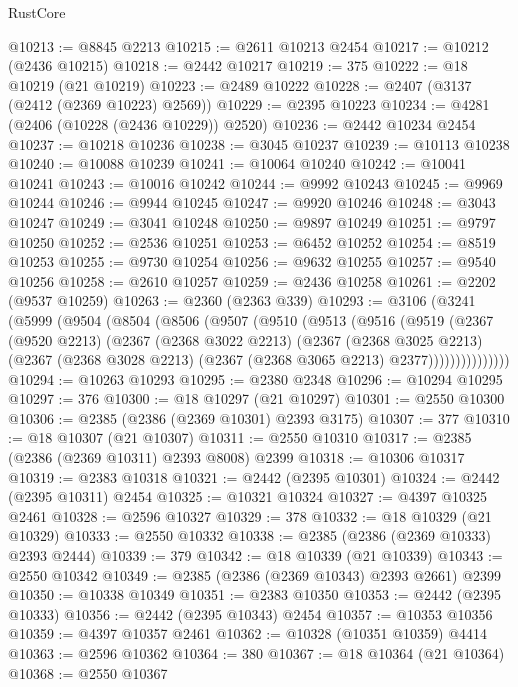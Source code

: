 \begin{lexlean}{RustCore}
\begin{coremodule}
@10213 := @8845 @2213
@10215 := @2611 @10213 @2454
@10217 := @10212 (@2436 @10215)
@10218 := @2442 @10217
@10219 := 375
@10222 := @18 @10219 (@21 @10219)
@10223 := @2489 @10222
@10228 := @2407 (@3137 (@2412 (@2369 @10223) @2569))
@10229 := @2395 @10223
@10234 := @4281 (@2406 (@10228 (@2436 @10229)) @2520)
@10236 := @2442 @10234 @2454
@10237 := @10218 @10236
@10238 := @3045 @10237
@10239 := @10113 @10238
@10240 := @10088 @10239
@10241 := @10064 @10240
@10242 := @10041 @10241
@10243 := @10016 @10242
@10244 := @9992 @10243
@10245 := @9969 @10244
@10246 := @9944 @10245
@10247 := @9920 @10246
@10248 := @3043 @10247
@10249 := @3041 @10248
@10250 := @9897 @10249
@10251 := @9797 @10250
@10252 := @2536 @10251
@10253 := @6452 @10252
@10254 := @8519 @10253
@10255 := @9730 @10254
@10256 := @9632 @10255
@10257 := @9540 @10256
@10258 := @2610 @10257
@10259 := @2436 @10258
@10261 := @2202 (@9537 @10259)
@10263 := @2360 (@2363 @339)
@10293 := @3106
    (@3241
      (@5999
        (@9504
          (@8504
            (@8506
              (@9507
                (@9510
                  (@9513
                    (@9516
                      (@9519
                        (@2367
                          (@9520 @2213)
                          (@2367
                            (@2368 @3022 @2213)
                            (@2367
                              (@2368 @3025 @2213)
                              (@2367
                                (@2368 @3028 @2213)
                                (@2367 (@2368 @3065 @2213) @2377)))))))))))))))
@10294 := @10263 @10293
@10295 := @2380 @2348
@10296 := @10294 @10295
@10297 := 376
@10300 := @18 @10297 (@21 @10297)
@10301 := @2550 @10300
@10306 := @2385 (@2386 (@2369 @10301) @2393 @3175)
@10307 := 377
@10310 := @18 @10307 (@21 @10307)
@10311 := @2550 @10310
@10317 := @2385 (@2386 (@2369 @10311) @2393 @8008) @2399
@10318 := @10306 @10317
@10319 := @2383 @10318
@10321 := @2442 (@2395 @10301)
@10324 := @2442 (@2395 @10311) @2454
@10325 := @10321 @10324
@10327 := @4397 @10325 @2461
@10328 := @2596 @10327
@10329 := 378
@10332 := @18 @10329 (@21 @10329)
@10333 := @2550 @10332
@10338 := @2385 (@2386 (@2369 @10333) @2393 @2444)
@10339 := 379
@10342 := @18 @10339 (@21 @10339)
@10343 := @2550 @10342
@10349 := @2385 (@2386 (@2369 @10343) @2393 @2661) @2399
@10350 := @10338 @10349
@10351 := @2383 @10350
@10353 := @2442 (@2395 @10333)
@10356 := @2442 (@2395 @10343) @2454
@10357 := @10353 @10356
@10359 := @4397 @10357 @2461
@10362 := @10328 (@10351 @10359) @4414
@10363 := @2596 @10362
@10364 := 380
@10367 := @18 @10364 (@21 @10364)
@10368 := @2550 @10367

\end{coremodule}
\end{lexlean}
